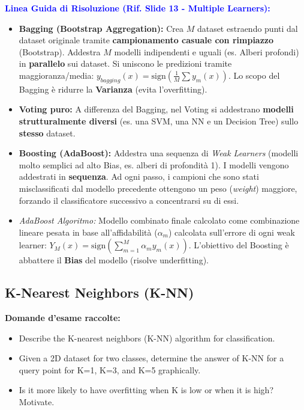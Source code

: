 \documentclass[11pt,a4paper]{article}
\begin{document}
\textbf{\textcolor{blue}{Linea Guida di Risoluzione (Rif. Slide 13 - Multiple Learners):}}
\begin{itemize}
    \item \textbf{Bagging (Bootstrap Aggregation):} Crea $M$ dataset estraendo punti dal dataset originale tramite \textbf{campionamento casuale con rimpiazzo} (Bootstrap). Addestra $M$ modelli indipendenti e uguali (es. Alberi profondi) in \textbf{parallelo} sui dataset. Si uniscono le predizioni tramite maggioranza/media: $y_{bagging}(x) = \text{sign}(\frac{1}{M}\sum y_m(x))$. Lo scopo del Bagging è ridurre la \textbf{Varianza} (evita l'overfitting).
    \item \textbf{Voting puro:} A differenza del Bagging, nel Voting si addestrano \textbf{modelli strutturalmente diversi} (es. una SVM, una NN e un Decision Tree) sullo \textbf{stesso} dataset.
    \item \textbf{Boosting (AdaBoost):} Addestra una sequenza di \textit{Weak Learners} (modelli molto semplici ad alto Bias, es. alberi di profondità 1). I modelli vengono addestrati in \textbf{sequenza}. Ad ogni passo, i campioni che sono stati misclassificati dal modello precedente ottengono un peso (\textit{weight}) maggiore, forzando il classificatore successivo a concentrarsi su di essi. 
    \item \textit{AdaBoost Algoritmo:} Modello combinato finale calcolato come combinazione lineare pesata in base all'affidabilità ($\alpha_m$) calcolata sull'errore di ogni weak learner: $Y_M(x) = \text{sign}(\sum_{m=1}^M \alpha_m y_m(x))$. L'obiettivo del Boosting è abbattere il \textbf{Bias} del modello (risolve underfitting).
\end{itemize}

\subsection{K-Nearest Neighbors (K-NN)}
\textbf{Domande d'esame raccolte:}
\begin{itemize}
    \item Describe the K-nearest neighbors (K-NN) algorithm for classification.
    \item Given a 2D dataset for two classes, determine the answer of K-NN for a query point for K=1, K=3, and K=5 graphically.
    \item Is it more likely to have overfitting when K is low or when it is high? Motivate.
\end{itemize}
\end{document}
